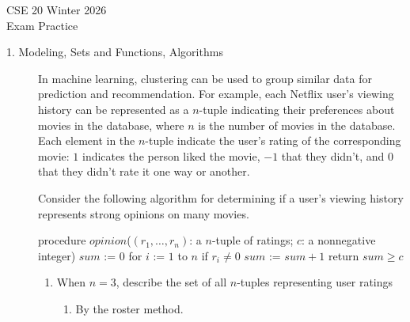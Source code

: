 \documentclass[12pt, oneside]{article}
\author{CSE20W26}
\newif \ifsolution
\newcommand{\sol}[1]{\medskip\fbox{\begin{minipage}{5.5in}{#1}\end{minipage}}\medskip}
\begin{document}
\begin{center}
{\Large
CSE 20 Winter 2026\\ 
Exam Practice \ifsolution{\qquad Solutions}\fi}
\end{center}

\thispagestyle{empty}

\ifsolution{}
\else{}
\fi

\begin{description}

\item[1. Modeling, Sets and Functions, Algorithms] 
In machine learning, clustering can be used to group similar data for prediction and recommendation.  For example,
each Netflix user's viewing history can be represented as a $n$-tuple indicating their preferences about
movies in the database, where $n$ is the number of movies in the database.  Each element in the $n$-tuple indicate
the user's rating of the corresponding movie: 
$1$ indicates the person liked the movie, $-1$
that they didn't, and $0$ that they didn't rate it one way or another.

Consider the following algorithm for determining if a user's viewing history represents
strong opinions on many movies.
\begin{algorithm}[caption={Determine if user's ratings tuple encode strong opinions}]
procedure $\textit{opinion}$($(r_1, \ldots, r_n)$: a $n$-tuple of ratings; $c$: a nonnegative integer)
$sum$ := $0$
for $i$ := $1$ to $n$
  if $r_i \neq 0$
    $sum$ := $sum + 1$
return $sum \geq c$
\end{algorithm}

  \begin{enumerate}\item When $n = 3$, describe the set of all $n$-tuples representing user ratings
  \begin{enumerate}\item By the roster method.
  
  \ifsolution{
  \sol{There are 27 $3$-tuples whose elements are each $-1$, $0$, or $1$.  We can list them as follows.
  \begin{align*}
  \{ & (-1, -1, -1) , (-1, -1, 0) , (-1, -1, 1) , (-1, 0, -1), (-1, 0, 0), (-1, 0, 1),\\
     & (-1, 1, -1), (-1, 1, 0), (-1, 1, 1), (0, -1, -1) , (0, -1, 0) , (0, -1, 1) , \\
     & (0, 0, -1), (0, 0, 0), (0, 0, 1), (0, 1, -1), (0, 1, 0), (0, 1, 1), (1, -1, -1) , \\
     & (1, -1, 0) , (1, -1, 1) , (1, 0, -1), (1, 0, 0), (1, 0, 1), (1, 1, -1), (1, 1, 0), (1, 1, 1) \}  
  \end{align*}
  }}\fi
  

\end{enumerate}
\end{enumerate}
\end{description}
\end{document}
